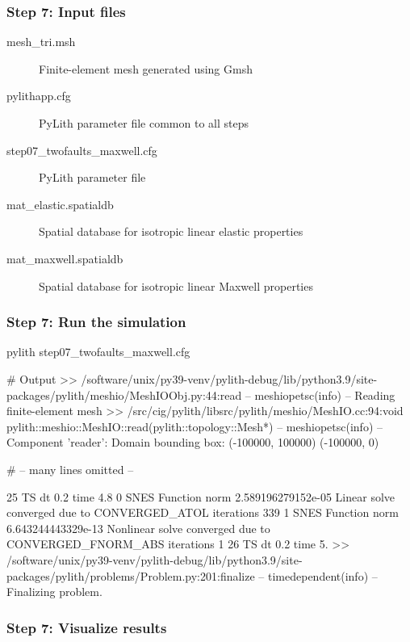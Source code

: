 \documentclass[aspectratio=169]{beamer}
\begin{document}
\begin{frame}
  \frametitle{Step 7: Input files}
  \summary{}

  \begin{description}
  \item[mesh\_tri.msh] Finite-element mesh generated using Gmsh
  \item[pylithapp.cfg] PyLith parameter file common to all steps
  \item[step07\_twofaults\_maxwell.cfg] PyLith parameter file
  \item[mat\_elastic.spatialdb] Spatial database for isotropic linear elastic properties
  \item[mat\_maxwell.spatialdb] Spatial database for isotropic linear Maxwell properties
  \end{description}
    
\end{frame}


\begin{frame}[fragile]
  \frametitle{Step 7: Run the simulation}
  \summary{}

\begin{bashcode}
pylith step07_twofaults_maxwell.cfg

# Output
 >> /software/unix/py39-venv/pylith-debug/lib/python3.9/site-packages/pylith/meshio/MeshIOObj.py:44:read
 -- meshiopetsc(info)
 -- Reading finite-element mesh
 >> /src/cig/pylith/libsrc/pylith/meshio/MeshIO.cc:94:void pylith::meshio::MeshIO::read(pylith::topology::Mesh*)
 -- meshiopetsc(info)
 -- Component 'reader': Domain bounding box:
    (-100000, 100000)
    (-100000, 0)

# -- many lines omitted --

25 TS dt 0.2 time 4.8
    0 SNES Function norm 2.589196279152e-05
    Linear solve converged due to CONVERGED_ATOL iterations 339
    1 SNES Function norm 6.643244443329e-13
  Nonlinear solve converged due to CONVERGED_FNORM_ABS iterations 1
26 TS dt 0.2 time 5.
 >> /software/unix/py39-venv/pylith-debug/lib/python3.9/site-packages/pylith/problems/Problem.py:201:finalize
 -- timedependent(info)
 -- Finalizing problem.
\end{bashcode}
  
\end{frame}


\begin{frame}
  \frametitle{Step 7: Visualize results}

    
\end{frame}



\end{document}
